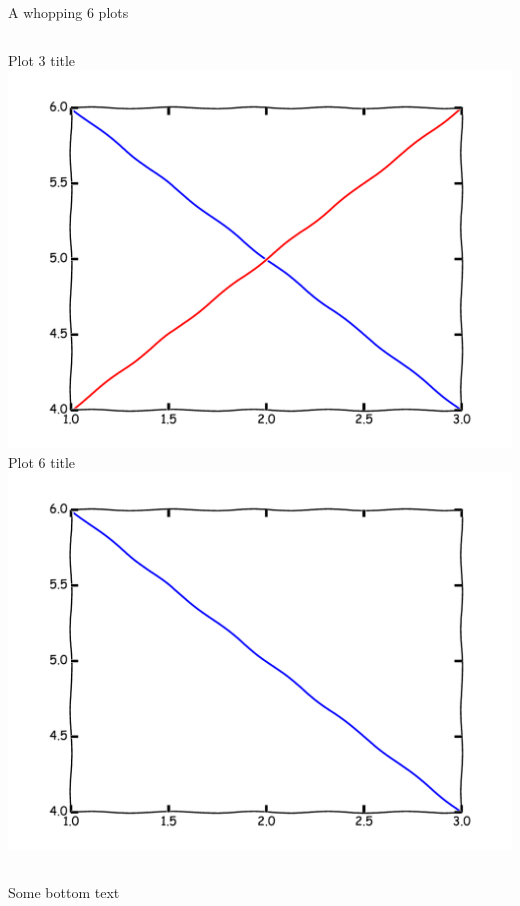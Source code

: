 \begin{frame}{A whopping 6 plots}
\begin{columns}
\begin{column}{0.33\textwidth}
\begin{center}
Plot 3 title
\\
\includegraphics[width=\textwidth]{example/plot3.pdf}
\\
Plot 6 title
\\
\includegraphics[width=\textwidth]{example/plot2.pdf}
\end{center}
\end{column}
\end{columns}
Some bottom text
\end{frame}
